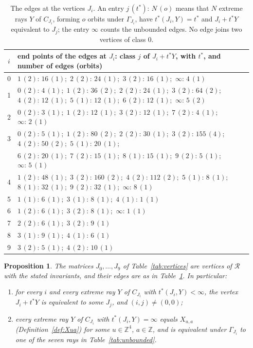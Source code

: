 \documentclass[11pt]{amsart}
\newtheorem{proposition}[theorem]{Proposition}
\theoremstyle{definition}
\theoremstyle{remark}
\numberwithin{equation}{section}
\numberwithin{table}{section}
\numberwithin{figure}{section}
\newcommand{\Z}{\mathbb{Z}}
\newcommand{\Rk}{\mathcal{R}}
\begin{document}
\begin{table}[t]
\centering
\small
\renewcommand{\arraystretch}{1.2}
\begin{tabular}{@{}c l@{}}
\toprule
$i$ & end points of the edges at $J_i$: class $j$ of $J_i+t^*Y$, with $t^*$, and number of edges (orbits)\\
\midrule
0 & $1\,(2){:}\,16\,(1)$;\ $2\,(2){:}\,24\,(1)$;\ $3\,(2){:}\,16\,(1)$;\ $\infty{:}\,4\,(1)$\\
1 & $0\,(2){:}\,4\,(1)$;\ $1\,(2){:}\,36\,(2)$;\ $2\,(2){:}\,24\,(1)$;\ $3\,(2){:}\,64\,(2)$;\ $4\,(2){:}\,12\,(1)$;\ $5\,(1){:}\,12\,(1)$;\ $6\,(2){:}\,12\,(1)$;\ $\infty{:}\,5\,(2)$\\
2 & $0\,(2){:}\,3\,(1)$;\ $1\,(2){:}\,12\,(1)$;\ $3\,(2){:}\,12\,(1)$;\ $7\,(2){:}\,4\,(1)$;\ $\infty{:}\,2\,(1)$\\
3 & $0\,(2){:}\,5\,(1)$;\ $1\,(2){:}\,80\,(2)$;\ $2\,(2){:}\,30\,(1)$;\ $3\,(2){:}\,155\,(4)$;\ $4\,(2){:}\,50\,(2)$;\ $5\,(1){:}\,20\,(1)$;\\
  & $6\,(2){:}\,20\,(1)$;\ $7\,(2){:}\,15\,(1)$;\ $8\,(1){:}\,15\,(1)$;\ $9\,(2){:}\,5\,(1)$;\ $\infty{:}\,5\,(1)$\\
4 & $1\,(2){:}\,48\,(1)$;\ $3\,(2){:}\,160\,(2)$;\ $4\,(2){:}\,112\,(2)$;\ $5\,(1){:}\,8\,(1)$;\ $8\,(1){:}\,32\,(1)$;\ $9\,(2){:}\,32\,(1)$;\ $\infty{:}\,8\,(1)$\\
5 & $1\,(1){:}\,6\,(1)$;\ $3\,(1){:}\,8\,(1)$;\ $4\,(1){:}\,1\,(1)$\\
6 & $1\,(2){:}\,6\,(1)$;\ $3\,(2){:}\,8\,(1)$;\ $\infty{:}\,1\,(1)$\\
7 & $2\,(2){:}\,6\,(1)$;\ $3\,(2){:}\,9\,(1)$\\
8 & $3\,(1){:}\,9\,(1)$;\ $4\,(1){:}\,6\,(1)$\\
9 & $3\,(2){:}\,5\,(1)$;\ $4\,(2){:}\,10\,(1)$\\
\bottomrule
\end{tabular}
\caption{The edges at the vertices $J_i$. An entry $j\,(t^*){:}\,N\,(o)$ means that $N$ extreme rays $Y$ of $C_{J_i}$, forming $o$ orbits under $\Gamma_{J_i}$, have $t^*(J_i,Y)=t^*$ and $J_i+t^*Y$ equivalent to $J_j$; the entry $\infty$ counts the unbounded edges. No edge joins two vertices of class $0$.}
\label{tab:edges}
\end{table}

\begin{proposition}\label{prop:computation}
The matrices $J_0,\dots,J_9$ of Table~\ref{tab:vertices} are vertices of $\Rk$ with the stated invariants, and their edges are as in Table~\ref{tab:edges}. In particular:
\begin{enumerate}
\item for every $i$ and every extreme ray $Y$ of $C_{J_i}$ with $t^*(J_i,Y)<\infty$, the vertex $J_i+t^*Y$ is equivalent to some $J_j$, and $(i,j)\ne(0,0)$;
\item every extreme ray $Y$ of $C_{J_i}$ with $t^*(J_i,Y)=\infty$ equals $X_{u,a}$ (Definition~\ref{def:Xua}) for some $u\in\Z^4$, $a\in\Z$, and is equivalent under $\Gamma_{J_i}$ to one of the seven rays in Table~\ref{tab:unbounded}.
\end{enumerate}
\end{proposition}
\end{document}
